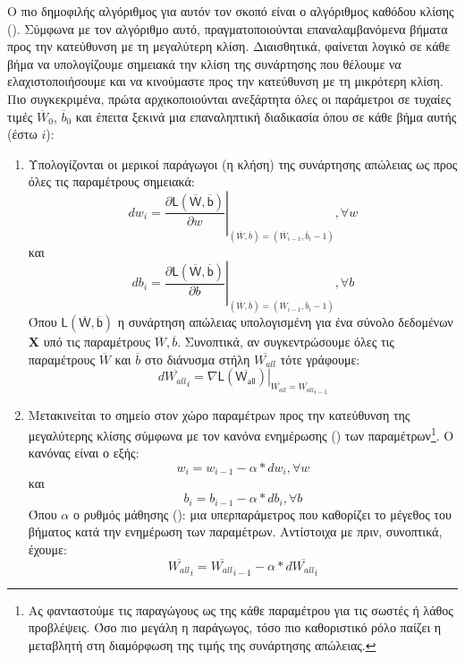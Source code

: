 Ο πιο δημοφιλής αλγόριθμος για αυτόν τον σκοπό είναι ο αλγόριθμος καθόδου κλίσης (). Σύμφωνα με τον αλγόριθμο αυτό, πραγματοποιούνται επαναλαμβανόμενα βήματα  προς την κατεύθυνση με τη μεγαλύτερη κλίση. Διαισθητικά, φαίνεται λογικό σε κάθε βήμα να υπολογίζουμε σημειακά την κλίση της συνάρτησης που θέλουμε να ελαχιστοποιήσουμε και να κινούμαστε προς την κατεύθυνση με τη μικρότερη κλίση. Πιο συγκεκριμένα, πρώτα αρχικοποιούνται ανεξάρτητα όλες οι παράμετροι σε τυχαίες τιμές $\overline{W}_0$, $\overline{b}_0$ και έπειτα ξεκινά μια επαναληπτική διαδικασία όπου σε κάθε βήμα αυτής (έστω $i$):
\begin{enumerate}
  \item Υπολογίζονται οι μερικοί παράγωγοι (η κλήση) της συνάρτησης απώλειας ως προς όλες τις παραμέτρους σημειακά:
    \begin{equation}
      dw_i = \left.\frac{\partial \mathsf{L(\overline{W},\overline{b})}}{\partial w}\right\rvert_{(\overline{W},\overline{b})=(\overline{W}_{i-1},\overline{b}_i-1)}, \forall{w}
    \end{equation}
    και
    \begin{equation}
    db_i = \left.\frac{\partial \mathsf{L(\overline{W},\overline{b})}}{\partial b}\right\rvert_{(\overline{W},\overline{b})=(\overline{W}_{i-1},\overline{b}_i-1)}, \forall{b}
    \end{equation}
    Όπου $\mathsf{L(\overline{W},\overline{b})}$ η συνάρτηση απώλειας υπολογισμένη για ένα σύνολο δεδομένων $\boldsymbol{X}$ υπό τις παραμέτρους $\overline{W},\overline{b}$.
    Συνοπτικά, αν συγκεντρώσουμε όλες τις παραμέτρους $\overline{W}$ και $\overline{b}$ στο διάνυσμα στήλη $\overline{W_{all}}$ τότε γράφουμε:
    \begin{equation}
      {d \overline{W_{all}}}_i = \left.\nabla{\mathsf{L(\overline{W_{all}})}}\right\rvert_{\overline{W_{all}}=\overline{W_{all}}_{i-1}}
    \end{equation}
  \item Μετακινείται το σημείο στον χώρο παραμέτρων προς την κατεύθυνση της μεγαλύτερης κλίσης σύμφωνα με τον κανόνα ενημέρωσης () των παραμέτρων\footnote{Ας φανταστούμε τις παραγώγους ως  της κάθε παραμέτρου για τις σωστές ή λάθος προβλέψεις. Όσο πιο μεγάλη η παράγωγος, τόσο πιο καθοριστικό ρόλο παίζει η μεταβλητή στη διαμόρφωση της τιμής της συνάρτησης απώλειας.}. Ο κανόνας είναι ο εξής:
  \begin{equation}
    w_i = w_{i-1} - \alpha \ast dw_i, \forall{w} \end{equation}
    και
    \begin{equation} b_i = b_{i-1} - \alpha \ast db_i, \forall{b}
    \end{equation}
    Όπου $\alpha$ ο ρυθμός μάθησης (): μια υπερπαράμετρος που καθορίζει το μέγεθος του βήματος κατά την ενημέρωση των παραμέτρων. Αντίστοιχα με πριν, συνοπτικά, έχουμε:
    \begin{equation}
      {\overline{W_{all}}}_i = {\overline{W_{all}}}_{i-1} - \alpha \ast {d \overline{W_{all}}}_i
    \end{equation}
\end{enumerate} 
